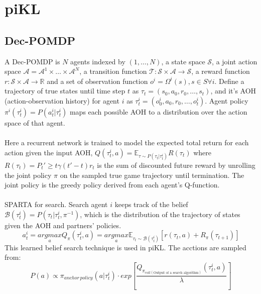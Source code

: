 \documentclass[12pt]{article}
\begin{document}
\section{piKL}
\subsection{Dec-POMDP}
A Dec-POMDP is $N$ agents indexed by $(1,\ldots,N)$, a state space $\mathcal{S}$, a joint action space $\mathcal{A}=\mathcal{A}^1\times \ldots \times \mathcal{A}^N$, a transition function $\mathcal{T}:\mathcal{S}\times \mathcal{A}\rightarrow \mathcal{S}$, a reward function $r:\mathcal{S}\times\mathcal{A}\rightarrow\mathbb{R}$ and a set of observation function $o^i=\Omega^i(s), s\in S\forall i$. Define a trajectory of true states until time step $t$ as $\tau_t=(s_0,a_0,r_0,\ldots,s_t)$, and it's AOH (action-observation history) for agent $i$ as $\tau_t^i=(o_0^i,a_0,r_0,\ldots,o_t^i)$. Agent policy $\pi^i(\tau_t^i)=P(a^i_t|\tau_t^i)$ maps each possible AOH to a distribution over the action space of that agent.\\
\\
Here a recurrent network is trained to model the expected total return for each action given the input AOH, $Q(\tau_t^i,a) = \mathbb{E}_{\tau\sim P (\tau_t|\tau^i_t)}R(\tau_t)$ where $R(\tau_t) = P_t'\geq t\gamma(t'-t)r_t$ is the sum of discounted future reward by unrolling the joint policy $\pi$ on the sampled true game trajectory until termination. The joint policy is the greedy policy derived from each agent's Q-function.\\
\\
SPARTA for search. Search agent $i$ keeps track of the belief $\mathcal{B}(\tau_t^i) = P(\tau_t|\tau_t^i,\pi^{-1})$, which is the distribution of the trajectory of states given the AOH and partners' policies.
\[a^i_t=\underset{a}{argmax}Q_\pi(\tau_t^i,a)=\underset{a}{argmax}\mathbb{E}_{\tau_t\sim\mathcal{B}(\tau_t^i)}[r(\tau_t,a)+R_\pi(\tau_{t+1})]\]
This learned belief search technique is used in piKL. The acctions are sampled from:
\[P(a)\propto \pi_{anchor\,policy}(a|\tau_t^i)\cdot  exp\left[\dfrac{Q_{\pi_{roll(\text{Output of a search algorithm})}}(\tau_t^i,a)}{\lambda}\right]\]
\end{document}
